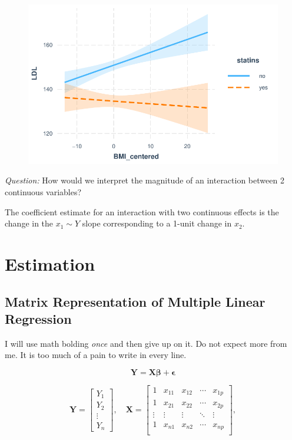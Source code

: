 \documentclass[
  letterpaper,
  DIV=11,
  numbers=noendperiod]{scrreport}
\begin{document}
\begin{figure}[H]

{\centering \includegraphics{week2/week2_files/figure-pdf/unnamed-chunk-10-1.pdf}

}

\end{figure}

\emph{Question:} How would we interpret the magnitude of an interaction
between 2 continuous variables?

The coefficient estimate for an interaction with two continuous effects
is the change in the \(x_1 \sim Y\) slope corresponding to a 1-unit
change in \(x_2\).


\hypertarget{estimation}{%
\chapter{Estimation}\label{estimation}}

\hypertarget{matrix-representation-of-multiple-linear-regression}{%
\section{Matrix Representation of Multiple Linear
Regression}\label{matrix-representation-of-multiple-linear-regression}}

I will use math bolding \emph{once} and then give up on it. Do not
expect more from me. It is too much of a pain to write in every line.

\[ \pmb Y = \pmb X \pmb \beta + \pmb \epsilon \]

\[ \pmb Y = \left[ \begin{array}{c} Y_1 \\ Y_2 \\ \vdots \\ Y_n \end{array}  \right],
\quad \pmb X = \left[ \begin{array}{ccccc} 1 & x_{11} & x_{12} & \cdots & x_{1p} \\
1 & x_{21} & x_{22} & \cdots & x_{2p} \\
\vdots & \vdots & \vdots & \ddots & \vdots \\
1 & x_{n1} & x_{n2} & \cdots & x_{np} \\
\end{array} \right], \]
\end{document}
